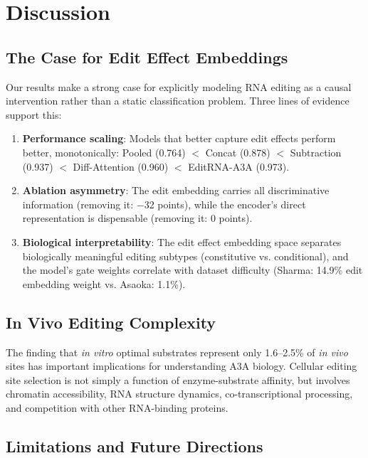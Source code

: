 \documentclass[11pt]{article}
\begin{document}
\section{Discussion}

\subsection{The Case for Edit Effect Embeddings}

Our results make a strong case for explicitly modeling RNA editing as a causal
intervention rather than a static classification problem. Three lines of evidence
support this:

\begin{enumerate}
  \item \textbf{Performance scaling}: Models that better capture edit effects
    perform better, monotonically: Pooled (0.764) $<$ Concat (0.878) $<$
    Subtraction (0.937) $<$ Diff-Attention (0.960) $<$ EditRNA-A3A (0.973).

  \item \textbf{Ablation asymmetry}: The edit embedding carries all discriminative
    information (removing it: $-$32 points), while the encoder's direct
    representation is dispensable (removing it: 0 points).

  \item \textbf{Biological interpretability}: The edit effect embedding space
    separates biologically meaningful editing subtypes (constitutive vs.
    conditional), and the model's gate weights correlate with dataset difficulty
    (Sharma: 14.9\% edit embedding weight vs. Asaoka: 1.1\%).
\end{enumerate}

\subsection{In Vivo Editing Complexity}

The finding that \emph{in vitro} optimal substrates represent only 1.6--2.5\%
of \emph{in vivo} sites has important implications for understanding A3A biology.
Cellular editing site selection is not simply a function of enzyme-substrate
affinity, but involves chromatin accessibility, RNA structure dynamics,
co-transcriptional processing, and competition with other RNA-binding proteins.

\subsection{Limitations and Future Directions}
\end{document}
